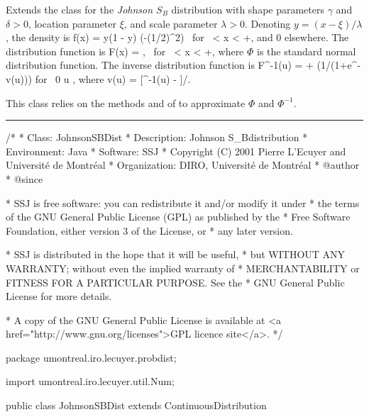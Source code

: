
Extends the class  for
the {\em Johnson $S_B$\/} distribution
with shape parameters $\gamma$ and $\delta > 0$, location parameter $\xi$, 
and scale parameter $\lambda>0$.
Denoting $y=(x-\xi)/\lambda$, the density is
\eq
 f(x) = \html{\delta/(}\latex{\frac {\delta}} {\lambda y(1 - y)\sqrt{2\pi}}
  \exp(-(1/2)^2)\html{)}
  \mbox { for } \xi < x < \xi+\lambda,     
\endeq
and 0 elsewhere.  The distribution function is
\eq
 F(x) = ,
     \mbox { for } \xi < x < \xi+\lambda,   
\endeq
where $\Phi$ is the standard normal distribution function.
The inverse distribution function is
\eq
  F^{-1}(u) = \xi + \lambda (1/(1+e^{-v(u)})) \qquad\mbox{for }  0 \le u ,
\endeq  
where
\eq
  v(u) = [\Phi^{-1}(u) - \gamma]/\delta.
\endeq

This class relies on the methods   and
of  to approximate $\Phi$ and $\Phi^{-1}$.


\bigskip\hrule

\begin{code}
\begin{hide}
/*
 * Class:        JohnsonSBDist
 * Description:  Johnson S_Bdistribution
 * Environment:  Java
 * Software:     SSJ 
 * Copyright (C) 2001  Pierre L'Ecuyer and Université de Montréal
 * Organization: DIRO, Université de Montréal
 * @author       
 * @since

 * SSJ is free software: you can redistribute it and/or modify it under
 * the terms of the GNU General Public License (GPL) as published by the
 * Free Software Foundation, either version 3 of the License, or
 * any later version.

 * SSJ is distributed in the hope that it will be useful,
 * but WITHOUT ANY WARRANTY; without even the implied warranty of
 * MERCHANTABILITY or FITNESS FOR A PARTICULAR PURPOSE.  See the
 * GNU General Public License for more details.

 * A copy of the GNU General Public License is available at
   <a href="http://www.gnu.org/licenses">GPL licence site</a>.
 */
\end{hide}
package umontreal.iro.lecuyer.probdist;\begin{hide}
import umontreal.iro.lecuyer.util.Num;
\end{hide}

public class JohnsonSBDist extends ContinuousDistribution\begin{hide} {
   private double gamma;
   private double delta;
   private double xi;
   private double lambda;\end{hide}
\end{code}
   
